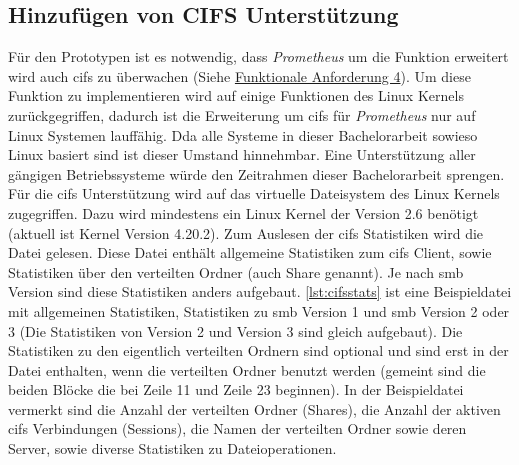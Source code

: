 \documentclass[titlepage]{report}
\begin{document}
\subsection{Hinzufügen von CIFS Unterstützung}
Für den Prototypen ist es notwendig, dass \emph{Prometheus} um die
Funktion erweitert wird auch \gls{cifs} zu überwachen (Siehe
\hyperref[table:mapping1]{Funktionale Anforderung 4}). Um diese Funktion
zu implementieren wird auf einige Funktionen des Linux Kernels
zurückgegriffen, dadurch ist die Erweiterung um \gls{cifs} für
\emph{Prometheus} nur auf Linux Systemen lauffähig. Dda alle Systeme in
dieser Bachelorarbeit sowieso Linux basiert sind ist dieser Umstand
hinnehmbar. Eine Unterstützung aller gängigen Betriebssysteme würde den
Zeitrahmen dieser Bachelorarbeit sprengen. Für die \gls{cifs}
Unterstützung wird auf das virtuelle Dateisystem  des Linux
Kernels zugegriffen. Dazu wird mindestens ein Linux Kernel der Version
2.6 benötigt\cite{CIFSCLIENTGUIDE} (aktuell ist Kernel Version 4.20.2\cite{KERNEL}).
Zum Auslesen der \gls{cifs} Statistiken wird die Datei
 gelesen. Diese Datei enthält allgemeine
Statistiken zum \gls{cifs} Client, sowie Statistiken über den verteilten
Ordner (auch Share genannt). Je nach \gls{smb} Version sind diese
Statistiken anders aufgebaut. \autoref{lst:cifsstats} ist eine Beispieldatei
mit allgemeinen Statistiken, Statistiken zu \gls{smb} Version 1
und \gls{smb} Version 2 oder 3 (Die Statistiken von Version 2 und
Version 3 sind gleich aufgebaut). Die Statistiken zu den eigentlich
verteilten Ordnern sind optional und sind erst in der Datei enthalten,
wenn die verteilten Ordner benutzt werden (gemeint sind die beiden
Blöcke die bei Zeile 11 und Zeile 23 beginnen). In der Beispieldatei
vermerkt sind die Anzahl der verteilten Ordner (Shares), die Anzahl der
aktiven \gls{cifs} Verbindungen (Sessions), die Namen der verteilten
Ordner sowie deren Server,  sowie diverse Statistiken zu
Dateioperationen.
\end{document}
